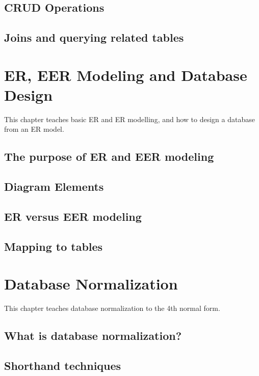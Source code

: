 \section{CRUD Operations}

\section{Joins and querying related tables}

\chapter{ER, EER Modeling and Database Design}
\label{chap:relational:eer-modeling-and-database-design}
This chapter teaches basic ER and ER modelling, and how to design a database from an ER model.

\section{The purpose of ER and EER modeling}
\section{Diagram Elements}
\section{ER versus EER modeling}
\section{Mapping to tables}

\chapter{Database Normalization}
\label{chap:relational:database-normalization}
This chapter teaches database normalization to the 4th normal form.

\section{What is database normalization?}
\section{Shorthand techniques}
